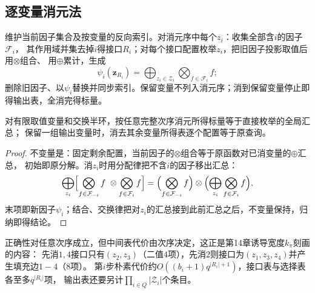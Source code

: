 \subsection{逐变量消元法}
\begin{algorithm}[变量消元]
  维护当前因子集合及按变量的反向索引。对消元序中每个$z_i$：收集全部含$i$的因子$\mathcal F_i$，
  其作用域并集去掉$i$得接口$R_i$；对每个接口配置枚举$z_i$，把旧因子投影取值后用$\otimes$组合、
  用$\oplus$累计，生成
  \[
    \psi_i(\bm z_{R_i})=\bigoplus_{z_i\in\mathcal Z_i}\bigotimes_{f\in\mathcal F_i}f;
  \]
  删除旧因子、以$\psi_i$替换并同步索引。保留变量不列入消元序；消到保留变量停止即得输出表，全消完得标量。
\end{algorithm}

\begin{theorem}[半环变量消除的正确性]
  \label{thm:graph-theory-semiring-elimination}
  对有限取值变量和交换半环，按任意完整次序消元所得标量等于直接枚举的全局汇总；
  保留一组输出变量时，消去其余变量所得表逐个配置等于原查询。
\end{theorem}
\begin{proof}
不变量是：固定剩余配置，当前因子的$\otimes$组合等于原函数对已消变量的$\oplus$汇总，
初始即原分解。消$z_i$时用分配律把不含$i$的因子移出汇总：
\[
  \bigoplus_{z_i}\Bigl[\bigotimes_{f\in\mathcal F_{-i}}f\ \otimes\bigotimes_{f\in\mathcal F_i}f\Bigr]
  =\Bigl(\bigotimes_{f\in\mathcal F_{-i}}f\Bigr)\otimes
   \Bigl(\bigoplus_{z_i}\bigotimes_{f\in\mathcal F_i}f\Bigr),
\]
末项即新因子$\psi_i$；结合、交换律把对$z_i$的汇总接到此前汇总之后，不变量保持，归纳即得结论。
\end{proof}
正确性对任意次序成立，但中间表代价由次序决定，这正是第14章诱导宽度$k_\pi$刻画的内容：
先消$1,4$接口只有$(z_2,z_3)$（二值$4$项），先消$2$则接口为$(z_1,z_3,z_4)$并产生填充边$1-4$（$8$项）。
第$i$步朴素代价约$O((b_i+1)q^{|R_i|+1})$，接口表与选择表各至多$q^{|R_i|}$项，
输出表还要另计$\prod_{i\in Q}|\mathcal Z_i|$个条目。
